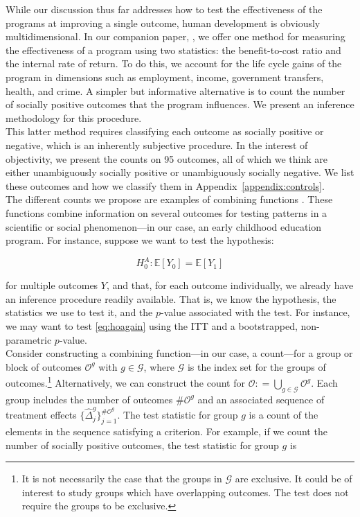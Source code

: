 \noindent While our discussion thus far addresses how to test the effectiveness of the programs at improving a single outcome, human development is obviously multidimensional. In our companion paper, \citet{Elango_et_al_2015_ABC_unpublished}, we offer one method for measuring the effectiveness of a program using two statistics: the benefit-to-cost ratio and the internal rate of return. To do this, we account for the life cycle gains of the program in dimensions such as employment, income, government transfers, health, and crime. A simpler but informative alternative is to count the number of socially positive outcomes that the program influences. We present an inference methodology for this procedure.\\

\noindent This latter method requires classifying each outcome as socially positive or negative, which is an inherently subjective procedure. In the interest of objectivity, we present the counts on 95 outcomes, all of which we think are either unambiguously socially positive or unambiguously socially negative. We list these outcomes and how we classify them in Appendix~\ref{appendix:controls}.\\

\noindent The different counts we propose are examples of combining functions \citep[see][]{Pesarin_Salmaso_2010_PermutationTests}. These functions combine information on several outcomes for testing patterns in a scientific or social phenomenon---in our case, an early childhood education program. For instance, suppose we want to test the hypothesis: 

\begin{equation}
H_{0}^A: \mathbb{E} \left[ Y_{0} \right] =  \mathbb{E} \left[ Y_{1} \right] \label{eq:hoagain}
\end{equation}

\noindent for multiple outcomes $Y$, and that, for each outcome individually, we already have an inference procedure readily available. That is, we know the hypothesis, the statistics we use to test it, and the $p$-value associated with the test. For instance, we may want to test \eqref{eq:hoagain} using the ITT and a bootstrapped, non-parametric $p$-value.\\

\noindent Consider constructing a combining function---in our case, a count---for a group or block of outcomes $\mathcal{O}^g$ with $g \in \mathcal{G}$, where $\mathcal{G}$ is the index set for the groups of outcomes.\footnote{It is not necessarily the case that the groups in $\mathcal{G}$ are exclusive. It could be of interest to study groups which have overlapping outcomes. The test does not require the groups to be exclusive.} Alternatively, we can construct the count for $\mathcal{O} : =  \bigcup \limits _{g \in \mathcal{G}} \mathcal{O}^g$. Each group includes the number of outcomes $\# \mathcal{O}^g$ and an associated sequence of treatment effects $\{ \widehat{\Delta}_{j}^{g} \}_{j = 1}^{\# \mathcal{O}^g}$. The test statistic for group $g$ is a count of the elements in the sequence satisfying a criterion. For example, if we count the number of socially positive outcomes, the test statistic for group $g$ is 

